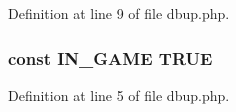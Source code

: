 Definition at line 9 of file dbup.\+php.

\hypertarget{dbup_8php_a12c82f3d28569a3f80804f1e72cef14c}{
\subsubsection[{I\+N\+\_\+\+G\+A\+M\+E}]{\setlength{\rightskip}{0pt plus 5cm}const I\+N\+\_\+\+G\+A\+M\+E T\+R\+U\+E}}\label{dbup_8php_a12c82f3d28569a3f80804f1e72cef14c}


Definition at line 5 of file dbup.\+php.

